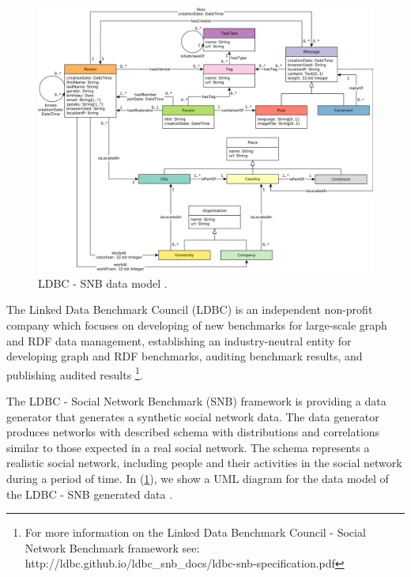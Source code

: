 {\begin{figure}[hbtp]
\centering
\includegraphics[width=1\textwidth]{pics/LDBC.png}
\caption{LDBC - SNB data model \cite{prat2017ldbc}.}
\label{fig:LDBC-DataModel}
\end{figure} 

The Linked Data Benchmark Council (LDBC) is an independent non-profit company which focuses on developing of new benchmarks for large-scale graph and RDF data management, establishing an industry-neutral entity for developing graph and RDF benchmarks, auditing benchmark results, and publishing audited results \footnote{For more information on the Linked Data Benchmark Council - Social Network Benchmark framework see:  http://ldbc.github.io/ldbc\_snb\_docs/ldbc-snb-specification.pdf}.

The LDBC - Social Network Benchmark (SNB) framework is providing a data generator that generates a synthetic
social network data. The data generator produces networks with described schema with distributions and correlations similar to those expected in a real social network. The schema represents a realistic social network, including people and their activities in the social network during a period of time. In (\ref{fig:LDBC-DataModel}), we show a UML diagram for the data model of the LDBC - SNB generated data \cite{prat2017ldbc}.

}
